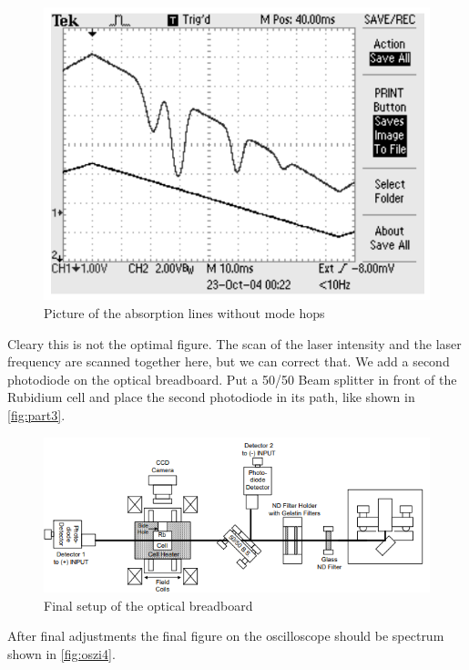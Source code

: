 \begin{figure}
    \centering
    \includegraphics[width=\textwidth]{images/oszi.png}
    \caption{Picture of the absorption lines without mode hops \cite{V60}}
    \label{fig:osci3}
\end{figure}
Cleary this is not the optimal figure.
The scan of the laser intensity and the laser frequency are scanned together here, but we can correct that.
We add a second photodiode on the optical breadboard.
Put a 50/50 Beam splitter in front of the Rubidium cell and place the second photodiode in its path, like shown in \autoref{fig:part3}.
\begin{figure}
    \centering
    \includegraphics[width=\textwidth]{images/part3.png}
    \caption{Final setup of the optical breadboard \cite{V60}}
    \label{fig:part3}
\end{figure}
After final adjustments the final figure on the oscilloscope should be spectrum shown in \autoref{fig:oszi4}.
